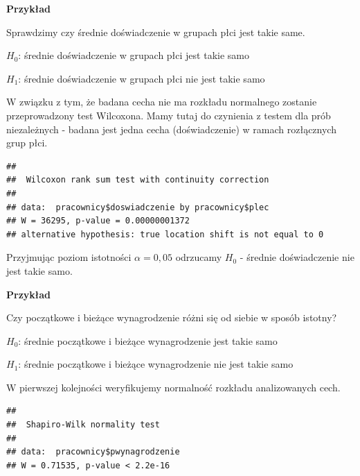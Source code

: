 \documentclass[]{book}
\newenvironment{Shaded}{\begin{snugshade}}{\end{snugshade}}
\newcommand{\KeywordTok}[1]{\textcolor[rgb]{0.13,0.29,0.53}{\textbf{#1}}}
\newcommand{\NormalTok}[1]{#1}
\newcommand{\OperatorTok}[1]{\textcolor[rgb]{0.81,0.36,0.00}{\textbf{#1}}}
\newcommand{\StringTok}[1]{\textcolor[rgb]{0.31,0.60,0.02}{#1}}
\begin{document}
\textbf{Przykład}

Sprawdzimy czy średnie doświadczenie w grupach płci jest takie same.

\(H_0\): średnie doświadczenie w grupach płci jest takie samo

\(H_1\): średnie doświadczenie w grupach płci nie jest takie samo

W związku z tym, że badana cecha nie ma rozkładu normalnego zostanie przeprowadzony test Wilcoxona. Mamy tutaj do czynienia z testem dla prób niezależnych - badana jest jedna cecha (doświadczenie) w ramach rozłącznych grup płci.

\begin{Shaded}
\end{Shaded}

\begin{verbatim}
## 
##  Wilcoxon rank sum test with continuity correction
## 
## data:  pracownicy$doswiadczenie by pracownicy$plec
## W = 36295, p-value = 0.00000001372
## alternative hypothesis: true location shift is not equal to 0
\end{verbatim}

Przyjmując poziom istotności \(\alpha = 0,05\) odrzucamy \(H_0\) - średnie doświadczenie nie jest takie samo.

\textbf{Przykład}

Czy początkowe i bieżące wynagrodzenie różni się od siebie w sposób istotny?

\(H_0\): średnie początkowe i bieżące wynagrodzenie jest takie samo

\(H_1\): średnie początkowe i bieżące wynagrodzenie nie jest takie samo

W pierwszej kolejności weryfikujemy normalność rozkładu analizowanych cech.

\begin{Shaded}
\end{Shaded}

\begin{verbatim}
## 
##  Shapiro-Wilk normality test
## 
## data:  pracownicy$pwynagrodzenie
## W = 0.71535, p-value < 2.2e-16
\end{verbatim}
\end{document}
